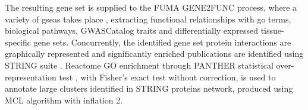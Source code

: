 The resulting gene set is supplied to the FUMA GENE2FUNC process, where a variety of \acp{gsea} takes place \cite{Watanabe2017}, extracting functional relationships with \ac{go} terms, biological pathways, GWASCatalog traits and differentially expressed tissue-specific gene sets. Concurrently, the identified gene set protein interactions are graphically represented and significantly enriched publications are identified using STRING suite \cite{Szklarczyk2021}. Reactome GO enrichment through PANTHER statistical over-representation test \cite{Mi2019}, with Fisher's exact test without correction, is used to annotate large clusters identified in STRING proteins network, produced using MCL algorithm with inflation 2.

	


